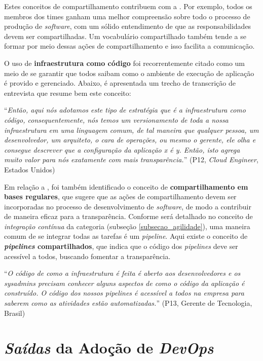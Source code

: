 Estes conceitos de compartilhamento contribuem com a \cc. Por exemplo, todos os
membros dos times ganham uma melhor compreensão sobre todo o processo de produção
de {\it software}, com um sólido entendimento de que as responsabilidades devem
ser compartilhadas. Um vocabulário compartilhado também tende a se formar por
meio dessas ações de compartilhamento e isso facilita a comunicação.

O uso de {\bf infraestrutura como código} foi recorrentemente citado como um
meio de se garantir que todos saibam como o ambiente de execução de aplicação
é provido e gerenciado. Abaixo, é apresentada um trecho de transcrição de
entrevista que resume bem este conceito:

\begin{mq}
``\emph{Então, aqui nós adotamos este tipo de estratégia
que é a infraestrutura como código, consequentemente, nós temos um versionamento
de toda a nossa infraestrutura em uma linguagem comum, de tal maneira que
qualquer pessoa, um desenvolvedor, um arquiteto, o cara de operações, ou mesmo
o gerente, ele olha e consegue descrever que a configuração da aplicação x é
y. Então, isto agrega muito valor para nós exatamente com mais transparência.}'' (P12, {\it Cloud Engineer}, Estados Unidos)
\end{mq}

Em relação a , foi também identificado o
conceito de \textbf{compartilhamento em bases regulares}, que sugere que as
ações de compartilhamento devem ser incorporadas no processo de
desenvolvimento de {\it software}, de modo a contribuir de maneira eficaz
para a transparência. Conforme será detalhado no conceito de \emph{integração
contínua} da categoria  (subseção \ref{subsecao_agilidade}), uma
maneira comum de se integrar todas as tarefas é um {\it pipeline}. Aqui existe
o conceito de \textbf{\emph{pipelines} compartilhados}, que indica que o
código dos {\it pipelines} deve ser acessível a todos, buscando fomentar a
transparência.

\begin{mq}
``\emph{O código de como a infraestrutura é feita é aberto aos desenvolvedores
e os sysadmins precisam conhecer alguns aspectos de como o código da aplicação
é construído. O código dos nossos pipelines é acessível a todos na empresa
para saberem como as atividades estão automatizadas.}''
(P13, Gerente de Tecnologia, Brasil)
\end{mq}

\section{\emph{Saídas} da Adoção de \emph{DevOps}}\label{secao_saidas}

